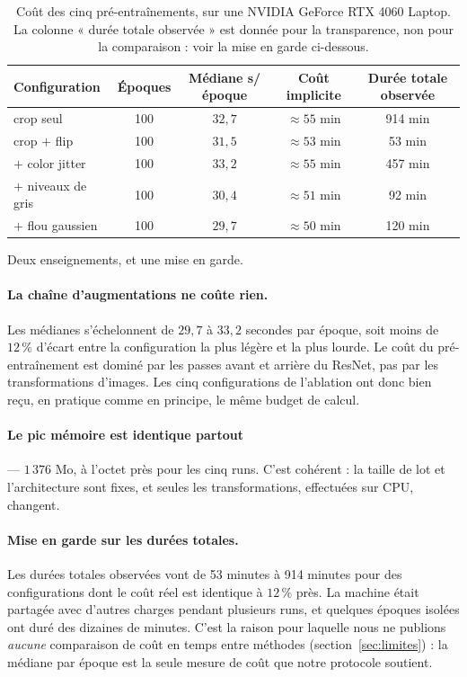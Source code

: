 \documentclass[11pt,a4paper]{article}
\begin{document}
\begin{table}[htbp]
\centering\small
\caption{Coût des cinq pré-entraînements, sur une NVIDIA GeForce RTX 4060 Laptop.
La colonne « durée totale observée » est donnée pour la transparence, non pour la
comparaison : voir la mise en garde ci-dessous.}
\begin{tabular}{@{}lcccc@{}}
\toprule
\textbf{Configuration} & \textbf{Époques} & \textbf{Médiane s/époque} & \textbf{Coût implicite}
& \textbf{Durée totale observée} \\
\midrule
crop seul               & 100 & $32{,}7$ & $\approx 55$ min & 914 min \\
crop $+$ flip           & 100 & $31{,}5$ & $\approx 53$ min & \phantom{0}53 min \\
$+$ color jitter        & 100 & $33{,}2$ & $\approx 55$ min & 457 min \\
$+$ niveaux de gris     & 100 & $30{,}4$ & $\approx 51$ min & \phantom{0}92 min \\
$+$ flou gaussien       & 100 & $29{,}7$ & $\approx 50$ min & 120 min \\
\bottomrule
\end{tabular}
\end{table}

Deux enseignements, et une mise en garde.

\paragraph{La chaîne d'augmentations ne coûte rien.} Les médianes s'échelonnent de $29{,}7$ à
$33{,}2$ secondes par époque, soit moins de $12\,\%$ d'écart entre la configuration la plus
légère et la plus lourde. Le coût du pré-entraînement est dominé par les passes avant et
arrière du ResNet, pas par les transformations d'images. Les cinq configurations de
l'ablation ont donc bien reçu, en pratique comme en principe, le même budget de calcul.

\paragraph{Le pic mémoire est identique partout} --- $1\,376$ Mo, à l'octet près pour les
cinq runs. C'est cohérent : la taille de lot et l'architecture sont fixes, et seules les
transformations, effectuées sur CPU, changent.

\paragraph{Mise en garde sur les durées totales.} Les durées totales observées vont de 53
minutes à 914 minutes pour des configurations dont le coût réel est identique à $12\,\%$
près. La machine était partagée avec d'autres charges pendant plusieurs runs, et quelques
époques isolées ont duré des dizaines de minutes. C'est la raison pour laquelle nous ne
publions \emph{aucune} comparaison de coût en temps entre méthodes
(section~\ref{sec:limites}) : la médiane par époque est la seule mesure de coût que notre
protocole soutient.
\end{document}
